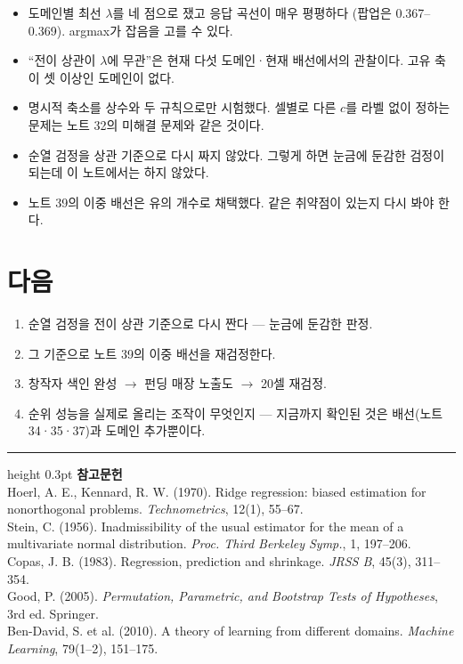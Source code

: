 \documentclass[10pt]{article}
\begin{document}
\begin{itemize}[leftmargin=1.1em,itemsep=0.15em]
\item 도메인별 최선 $\lambda$를 네 점으로 쟀고 응답 곡선이 매우 평평하다
      (팝업은 0.367--0.369). argmax가 잡음을 고를 수 있다.
\item ``전이 상관이 $\lambda$에 무관''은 현재 다섯 도메인·현재 배선에서의
      관찰이다. 고유 축이 셋 이상인 도메인이 없다.
\item 명시적 축소를 상수와 두 규칙으로만 시험했다. 셀별로 다른 $c$를 라벨 없이
      정하는 문제는 노트 32의 미해결 문제와 같은 것이다.
\item 순열 검정을 상관 기준으로 다시 짜지 않았다. 그렇게 하면 눈금에 둔감한
      검정이 되는데 이 노트에서는 하지 않았다.
\item 노트 39의 이중 배선은 유의 개수로 채택했다. 같은 취약점이 있는지 다시
      봐야 한다.
\end{itemize}

\section{다음}

\begin{enumerate}[leftmargin=1.3em,itemsep=0.15em]
\item 순열 검정을 전이 상관 기준으로 다시 짠다 --- 눈금에 둔감한 판정.
\item 그 기준으로 노트 39의 이중 배선을 재검정한다.
\item 창작자 색인 완성 $\to$ 펀딩 매장 노출도 $\to$ 20셀 재검정.
\item 순위 성능을 실제로 올리는 조작이 무엇인지 --- 지금까지 확인된 것은
      배선(노트 34·35·37)과 도메인 추가뿐이다.
\end{enumerate}

\vspace{0.6em}
\hrule height 0.3pt
\vspace{0.5em}
{\footnotesize
\textbf{참고문헌}\\[0.3em]
Hoerl, A. E., Kennard, R. W. (1970). Ridge regression: biased estimation for
nonorthogonal problems. \emph{Technometrics}, 12(1), 55--67.\\[0.15em]
Stein, C. (1956). Inadmissibility of the usual estimator for the mean of a
multivariate normal distribution. \emph{Proc. Third Berkeley Symp.}, 1, 197--206.\\[0.15em]
Copas, J. B. (1983). Regression, prediction and shrinkage. \emph{JRSS B},
45(3), 311--354.\\[0.15em]
Good, P. (2005). \emph{Permutation, Parametric, and Bootstrap Tests of
Hypotheses}, 3rd ed. Springer.\\[0.15em]
Ben-David, S. et al. (2010). A theory of learning from different domains.
\emph{Machine Learning}, 79(1--2), 151--175.
}
\end{document}
